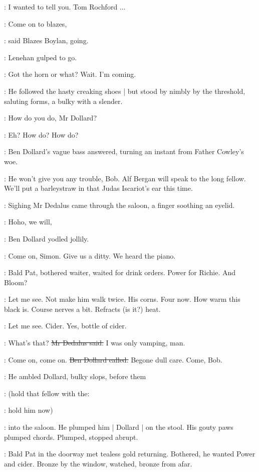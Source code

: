 \lenehan:
I wanted to tell you.
Tom Rochford ...

\boylan:
Come on to blazes,

:
said Blazes Boylan,
going.

:
Lenehan gulped to go.

\lenehan:
Got the horn or what?
Wait.
I'm coming.

:
He followed the hasty creaking shoes |
but stood by nimbly by the threshold,
saluting forms,
a bulky with a slender.

\lenehan:
How do you do,
Mr Dollard?

\dollard:
Eh?
How do?
How do?

:
Ben Dollard's vague bass answered,
turning an instant from Father Cowley's woe.

\dollard:
He won't give you any trouble,
Bob.
Alf Bergan will speak to the long fellow.
We'll put a barleystraw in that Judas Iscariot's ear this time.

:
Sighing Mr Dedalus came through the saloon,
a finger soothing an eyelid.

\dollard:
Hoho,
we will,

:
Ben Dollard yodled jollily.

\dollard:
Come on,
Simon.
Give us a ditty.
We heard the piano.

:
Bald Pat,
bothered waiter,
waited for drink orders.
Power for Richie.
And Bloom?

\BloomInt:
Let me see.
Not make him walk twice.
His corns.
Four now.
How warm this black is.
Course nerves a bit.
Refracts (is it?) heat.

\Bloom:
Let me see.
Cider.
Yes,
bottle of cider.

\simon:
What's that?
\sout{Mr Dedalus said.}
I was only vamping,
man.

\dollard:
Come on,
come on.
\sout{Ben Dollard called.}
Begone dull care.
Come,
Bob.

:
He ambled Dollard,
bulky slops,
before them

\simon:
(hold that fellow with the:

\dollard:
hold him now)

:
into the saloon.
He plumped him |
Dollard |
on the stool.
His gouty paws plumped chords.
Plumped,
stopped abrupt.

:
Bald Pat in the doorway met tealess gold returning.
Bothered,
he wanted Power and cider.
Bronze by the window,
watched,
bronze from afar.

